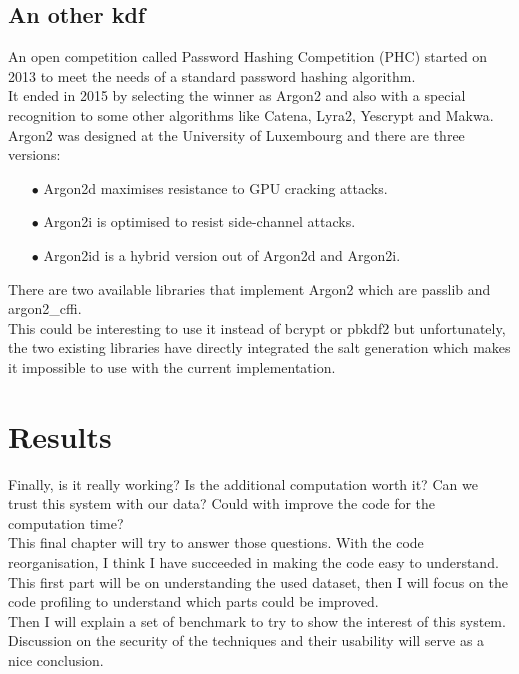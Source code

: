 \documentclass{eplmastersthesis}
\begin{document}
\section{An other \gls{kdf}}
An open competition called Password Hashing Competition (PHC) started on 2013 to meet the needs of a standard password hashing algorithm.\\ 
It ended in 2015 by selecting the winner as Argon2 and also with a special recognition to some other algorithms like Catena, Lyra2, Yescrypt and Makwa.\\
Argon2 was designed at the University of Luxembourg and there are three versions:
\begin{itemize}
\item[$\bullet$] Argon2d maximises resistance to GPU cracking attacks.
\item[$\bullet$] Argon2i is optimised to resist side-channel attacks.
\item[$\bullet$] Argon2id is a hybrid version out of Argon2d and Argon2i.
\end{itemize}

There are two available libraries that implement Argon2 which are passlib and argon2\_cffi.\\
This could be interesting to use it instead of bcrypt or \gls{pbkdf2} but unfortunately, the two existing libraries have directly integrated the salt generation which makes it impossible to use with the current implementation. \\

\chapter{Results}
Finally, is it really working? Is the additional computation worth it? Can we trust this system with our data? Could with improve the code for the computation time?\\
This final chapter will try to answer those questions. With the code reorganisation, I think I have succeeded in making the code easy to understand.\\
This first part will be on understanding the used dataset, then I will focus on the code profiling to understand which parts could be improved.\\
Then I will explain a set of benchmark to try to show the interest of this system.\\
Discussion on the security of the techniques and their usability will serve as a nice conclusion.\\
\end{document}
